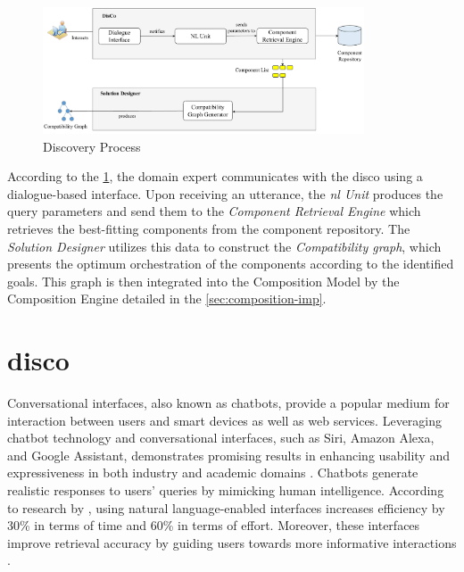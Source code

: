 \begin{figure}[hbt]
\hypertarget{fig:discovery-process}{%
\centering
\includegraphics[width=0.85\textwidth]{../figures/MyFigures/d&C (1).drawio.pdf}
\captionsetup{justification=centering}
\caption{Discovery Process}\label{fig:discovery-process}
}
\end{figure}

According to the \cref{fig:discovery-process}, the domain expert communicates with the
\gls{disco} using a dialogue-based interface. Upon receiving an utterance, the
\emph{\gls{nl} Unit} produces the query parameters and send them to the
\emph{Component Retrieval Engine} which retrieves the best-fitting
components from the component repository. The \emph{Solution Designer}
utilizes this data to construct the \emph{Compatibility graph}, which
presents the optimum orchestration of the components according to the
identified goals. This graph is then integrated into the Composition
Model by the Composition Engine detailed in the \cref{sec:composition-imp}.

\vspace{-10pt}
\hypertarget{sec:disco}{%
\section{\gls{disco}}\label{sec:disco}}
\vspace{10pt}

Conversational interfaces, also known as chatbots, provide a popular
medium for interaction between users and smart devices as well as web
services. Leveraging chatbot technology and conversational interfaces,
such as Siri, Amazon Alexa, and Google Assistant, demonstrates promising
results in enhancing usability and expressiveness in both industry and
academic domains \autocite{Raghuvanshi2018}. Chatbots generate realistic
responses to users' queries by mimicking human intelligence. According to 
research by \autocite{Fuckner2013}, using natural language-enabled interfaces 
increases efficiency by 30\% in terms of time and 60\% in terms of effort. 
Moreover, these interfaces improve retrieval accuracy by guiding users towards 
more informative interactions \autocite{Zarei2020}.

